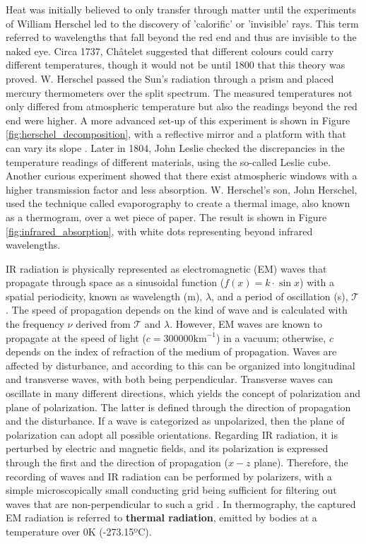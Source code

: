 \begin{kaobox}[frametitle=Discovery of infrared radiation]
Heat was initially believed to only transfer through matter until the experiments of William Herschel led to the discovery of 'calorific' or 'invisible' rays. This term referred to wavelengths that fall beyond the red end and thus are invisible to the naked eye. Circa 1737, Châtelet suggested that different colours could carry different temperatures, though it would not be until 1800 that this theory was proved. W. Herschel passed the Sun's radiation through a prism and placed mercury thermometers over the split spectrum. The measured temperatures not only differed from atmospheric temperature but also the readings beyond the red end were higher. A more advanced set-up of this experiment is shown in Figure \ref{fig:herschel_decomposition}, with a reflective mirror and a platform with that can vary its slope \cite{ring_discovery_2000, minkina_how_2021, minkina_infrared_2009}. Later in 1804, John Leslie checked the discrepancies in the temperature readings of different materials, using the so-called Leslie cube. Another curious experiment showed that there exist atmospheric windows with a higher transmission factor and less absorption. W. Herschel's son, John Herschel, used the technique called evaporography to create a thermal image, also known as a thermogram, over a wet piece of paper. The result is shown in Figure \ref{fig:infrared_absorption}, with white dots representing beyond infrared wavelengths. 
\end{kaobox}

IR radiation is physically represented as electromagnetic (EM) waves that propagate through space as a sinusoidal function ($f(x) = k \cdot \sin{x}$) with a spatial periodicity, known as wavelength (\si{\meter}), $\lambda$, and a period of oscillation (\si{\second}), $\mathcal{T}$. The speed of propagation depends on the kind of wave and is calculated with the frequency $\nu$ derived from $\mathcal{T}$ and $\lambda$. However, EM waves are known to propagate at the speed of light ($c = 300 000\si{\kilo\meter}^{-1}$) in a vacuum; otherwise, $c$ depends on the index of refraction of the medium of propagation. Waves are affected by disturbance, and according to this can be organized into longitudinal and transverse waves, with both being perpendicular. Transverse waves can oscillate in many different directions, which yields the concept of polarization and plane of polarization. The latter is defined through the direction of propagation and the disturbance. If a wave is categorized as unpolarized, then the plane of polarization can adopt all possible orientations. Regarding IR radiation, it is perturbed by electric and magnetic fields, and its polarization is expressed through the first and the direction of propagation ($x-z$ plane). Therefore, the recording of waves and IR radiation can be performed by polarizers, with a simple microscopically small conducting grid being sufficient for filtering out waves that are non-perpendicular to such a grid \cite{vollmer_infrared_2017}. In thermography, the captured EM radiation is referred to \textbf{thermal radiation}, emitted by bodies at a temperature over 0\si{\kelvin} (-273.15ºC). 

